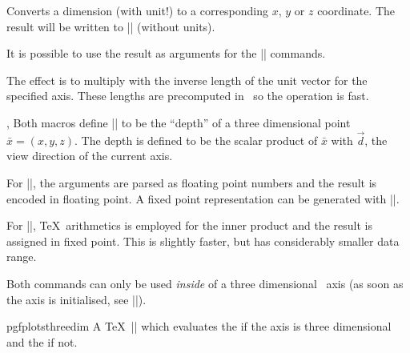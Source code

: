 \begin{command}{\pgfplotsconvertunittocoordinate{}}
	Converts a dimension (with unit!) to a corresponding $x$, $y$ or $z$ coordinate. The result will be written to |\pgfmathresult| (without units).

	It is possible to use the result as arguments for the |\pgfpointxyz| commands.

	The effect is to multiply  with the inverse length of the unit vector for the specified axis. These lengths are precomputed in \PGFPlots\ so the operation is fast.
\begin{codeexample}
\end{codeexample}
\end{command}

\begin{commandlist}{\pgfplotsmathfloatviewdepthxyz{},
	\pgfplotsmathviewdepthxyz{}}
	Both macros define |\pgfmathresult| to be the ``depth'' of a three dimensional point $\bar x = (x,y,z)$. The depth is defined to be the scalar product of $\bar x$ with $\vec d$, the view direction of the current axis.

	For |\pgfplotsmathfloatviewdepthxyz|, the arguments are parsed as floating point numbers and the result is encoded in floating point. A fixed point representation can be generated with |\pgfmathfloattofixed{\pgfmathresult}|.

	For |\pgfplotsmathviewdepthxyz|, \TeX\ arithmetics is employed for the inner product and the result is assigned in fixed point. This is slightly faster, but has considerably smaller data range.

	Both commands can only be used \emph{inside} of a three dimensional \PGFPlots\ axis (as soon as the axis is initialised, see |\pgfplotsextra|). 
\end{commandlist}

\begin{texif}{pgfplotsthreedim}
	A \TeX\ |\if| which evaluates the  if the axis is three dimensional and the  if not.
\end{texif}

